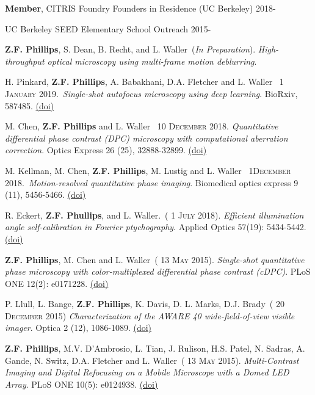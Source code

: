 \documentclass[12pt,letterpaper]{article}
\newcommand{\mhead}[1]{\leavevmode\marginpar{\sffamily\footnotesize #1}}
\newcommand{\rdate}[1]{{} \hfill #1}
\renewcommand{\date}[1]{{} #1}
\begin{document}
\textbf{Member}, CITRIS Foundry Founders in Residence (UC Berkeley) \rdate{2018-}

\medskip
\mhead{Volunteering}%
UC Berkeley SEED Elementary School Outreach \rdate{2015-}

\newpage
\mhead{Publications}%
\par\vspace{-\baselineskip}

\textbf{Z.F. Phillips}, S. Dean, B. Recht, and L. Waller~(\textit{In Preparation}).
\emph{High-throughput optical microscopy using multi-frame motion deblurring}.

\medskip
H. Pinkard, \textbf{Z.F. Phillips}, A. Babakhani, D.A. Fletcher and L. Waller~\date{1 \textsc{January} 2019}.~\emph{Single-shot autofocus microscopy using deep learning}. BioRxiv, 587485. \href{https://doi.org/10.1101/587485}{(doi)}

\medskip
M. Chen, \textbf{Z.F. Phillips} and L. Waller~\date{10 \textsc{December} 2018}. \emph{Quantitative differential phase contrast (DPC) microscopy with computational aberration correction}. Optics Express 26 (25), 32888-32899. \href{https://doi.org/10.1364/OE.26.032888}{(doi)}

\medskip
M. Kellman, M. Chen, \textbf{Z.F. Phillips}, M. Lustig and L. Waller~\date{1\textsc{December} 2018}.~\emph{Motion-resolved quantitative phase imaging}. Biomedical optics express 9 (11), 5456-5466. \href{https://doi.org/10.1364/BOE.9.005456}{(doi)}

\medskip
R. Eckert, \textbf{Z.F. Phullips}, and L. Waller.~(\date{1 \textsc{July} 2018}).
\emph{Efficient illumination angle self-calibration in Fourier ptychography}.
Applied Optics 57(19): 5434-5442. \href{https://doi.org/10.1364/AO.57.005434}{(doi)}

\medskip
\textbf{Z.F. Phillips}, M. Chen and L. Waller~(\date{13 \textsc{May} 2015}).
\emph{Single-shot quantitative phase microscopy with color-multiplexed differential phase contrast (cDPC)}.
PLoS ONE 12(2): e0171228. \href{http://journals.plos.org/plosone/article?id=10.1371/journal.pone.0171228}{(doi)}

\medskip
P. Llull, L. Bange, \textbf{Z.F. Phillips}, K. Davis, D. L. Marks, D.J. Brady~(\date{20 \textsc{December} 2015}) \emph{Characterization of the AWARE 40 wide-field-of-view visible imager}. Optica 2 (12), 1086-1089. \href{https://doi.org/10.1364/OPTICA.2.001086}{(doi)}

\medskip
\textbf{Z.F. Phillips}, M.V. D'Ambrosio, L. Tian, J. Rulison, H.S. Patel, N. Sadras, A. Gande, N. Switz, \linebreak D.A. Fletcher and L. Waller~(\date{13 \textsc{May} 2015}).
\emph{Multi-Contrast Imaging and Digital Refocusing on a Mobile  \linebreak Microscope with a Domed LED Array}.
PLoS ONE 10(5): e0124938. \href{http://journals.plos.org/plosone/article?id=10.1371/journal.pone.0124938}{(doi)}
\end{document}
